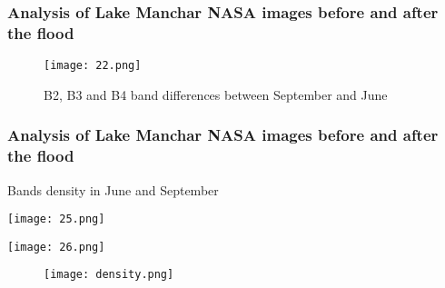 \documentclass{beamer}
\begin{document}
\begin{frame}
  \frametitle{\small Analysis of Lake Manchar NASA images before and after the flood} 

  \begin{figure}
      \centering
      \texttt{[image: 22.png]}
      \label{fig:enter-label}
      \caption{B2, B3 and B4 band differences between September and June}
  \end{figure}

\end{frame}


\begin{frame}
  \frametitle{\small Analysis of Lake Manchar NASA images before and after the flood} 

  \centering\small Bands density in June and September
  \vspace{1cm}

   \begin{minipage}{0.48\textwidth}
    \centering
    \texttt{[image: 25.png]}
  \end{minipage}
  \hfill
  \begin{minipage}{0.48\textwidth}
    \centering
    \texttt{[image: 26.png]}
    \caption{}
  \end{minipage}
\begin{figure}
    \centering
    \texttt{[image: density.png]}
    \label{fig:enter-label}
\end{figure}

\end{frame}
\end{document}
